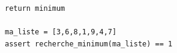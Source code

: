 \documentclass[a4paper,12pt,openany]{book}
\begin{document}
\begin{enumerate}
\begin{lstlisting}[numbers=none]
		return minimum
		
ma_liste = [3,6,8,1,9,4,7]
assert recherche_minimum(ma_liste) == 1
\end{lstlisting}	

\end{enumerate}
\end{document}
